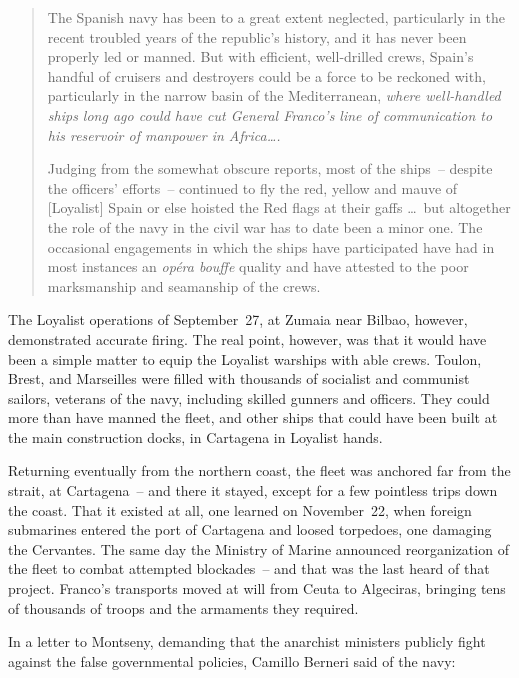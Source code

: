 \indexNYT{}
\begin{quotation}
  The Spanish navy has been to a great extent neglected, particularly in the recent troubled years of the republic’s history\kn, and it has never been properly led or manned. But with efficient, well-drilled crews, Spain’s handful of cruisers and destroyers could be a force to be reckoned with, particularly in the narrow basin of the Mediterranean, \emph{where well-handled ships long ago could have cut General Franco’s line of communication to his reservoir of manpower in Africa\dots.}
  
  Judging from the somewhat obscure reports, most of the ships~-- despite the officers’ efforts~-- continued to fly the red, yellow and mauve of [Loyalist] Spain or else hoisted the Red flags at their gaffs \dots\ but altogether the role of the navy in the civil war has to date been a minor one. The occasional engagements in which the ships have participated have had in most instances an \emph{op\'era bouffe} quality and have attested to the poor marksmanship and seamanship of the crews.
\end{quotation}

The Loyalist operations of September~27\kn, at Zumaia near Bilbao, however\kn, demonstrated accurate firing. The real point, however\kn, was that it would have been a simple matter to equip the Loyalist warships with able crews. Toulon, Brest, and Marseilles were filled with thousands of socialist and communist sailors, veterans of the navy\kn, including skilled gunners and officers. They could more than have manned the fleet, and other ships that could have been built at the main construction docks, in Cartagena in Loyalist hands.

Returning eventually from the northern coast, the fleet was anchored far from the strait, at Cartagena~-- and there it stayed, except for a few pointless trips down the coast. That it existed at all, one learned on November~22, when foreign submarines entered the port of Cartagena and loosed torpedoes, one damaging the Cervantes. The same day the Ministry of Marine announced reorganization of the fleet to combat attempted blockades~-- and that was the last heard of that project. Franco’s transports moved at will from Ceuta to Algeciras, bringing tens of thousands of troops and the armaments they required.

In a letter to Montseny\kn, demanding that the anarchist ministers publicly fight against the false governmental policies, Camillo Ber\-neri said of the navy:
\nowidow

